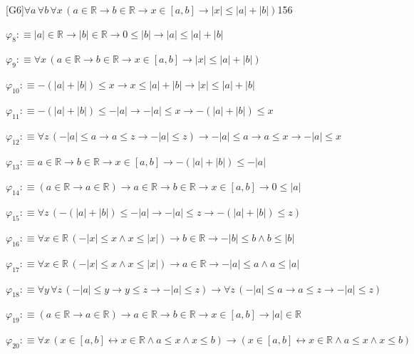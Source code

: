 \begin{fullproof}{[G6]}{$\forall a\,\forall b\,\forall x\,(a \in \mathbb{R} \to b \in \mathbb{R} \to x \in [a,b] \to \lvert x \rvert \leq \lvert a \rvert + \lvert b \rvert)$}{156}
\begin{abbrevlist}
\item $\varphi_{8} :\equiv \lvert a \rvert \in \mathbb{R} \to \lvert b \rvert \in \mathbb{R} \to 0 \leq \lvert b \rvert \to \lvert a \rvert \leq \lvert a \rvert + \lvert b \rvert$
\item $\varphi_{9} :\equiv \forall x\,(a \in \mathbb{R} \to b \in \mathbb{R} \to x \in [a,b] \to \lvert x \rvert \leq \lvert a \rvert + \lvert b \rvert)$
\item $\varphi_{10} :\equiv -(\lvert a \rvert + \lvert b \rvert) \leq x \to x \leq \lvert a \rvert + \lvert b \rvert \to \lvert x \rvert \leq \lvert a \rvert + \lvert b \rvert$
\item $\varphi_{11} :\equiv -(\lvert a \rvert + \lvert b \rvert) \leq -\lvert a \rvert \to -\lvert a \rvert \leq x \to -(\lvert a \rvert + \lvert b \rvert) \leq x$
\item $\varphi_{12} :\equiv \forall z\,(-\lvert a \rvert \leq a \to a \leq z \to -\lvert a \rvert \leq z) \to -\lvert a \rvert \leq a \to a \leq x \to -\lvert a \rvert \leq x$
\item $\varphi_{13} :\equiv a \in \mathbb{R} \to b \in \mathbb{R} \to x \in [a,b] \to -(\lvert a \rvert + \lvert b \rvert) \leq -\lvert a \rvert$
\item $\varphi_{14} :\equiv (a \in \mathbb{R} \to a \in \mathbb{R}) \to a \in \mathbb{R} \to b \in \mathbb{R} \to x \in [a,b] \to 0 \leq \lvert a \rvert$
\item $\varphi_{15} :\equiv \forall z\,(-(\lvert a \rvert + \lvert b \rvert) \leq -\lvert a \rvert \to -\lvert a \rvert \leq z \to -(\lvert a \rvert + \lvert b \rvert) \leq z)$
\item $\varphi_{16} :\equiv \forall x \in \mathbb{R}\,(-\lvert x \rvert \leq x \land x \leq \lvert x \rvert) \to b \in \mathbb{R} \to -\lvert b \rvert \leq b \land b \leq \lvert b \rvert$
\item $\varphi_{17} :\equiv \forall x \in \mathbb{R}\,(-\lvert x \rvert \leq x \land x \leq \lvert x \rvert) \to a \in \mathbb{R} \to -\lvert a \rvert \leq a \land a \leq \lvert a \rvert$
\item $\varphi_{18} :\equiv \forall y\,\forall z\,(-\lvert a \rvert \leq y \to y \leq z \to -\lvert a \rvert \leq z) \to \forall z\,(-\lvert a \rvert \leq a \to a \leq z \to -\lvert a \rvert \leq z)$
\item $\varphi_{19} :\equiv (a \in \mathbb{R} \to a \in \mathbb{R}) \to a \in \mathbb{R} \to b \in \mathbb{R} \to x \in [a,b] \to \lvert a \rvert \in \mathbb{R}$
\item $\varphi_{20} :\equiv \forall x\,(x \in [a,b] \leftrightarrow x \in \mathbb{R} \land a \leq x \land x \leq b) \to (x \in [a,b] \leftrightarrow x \in \mathbb{R} \land a \leq x \land x \leq b)$

\end{abbrevlist}
\end{fullproof}
